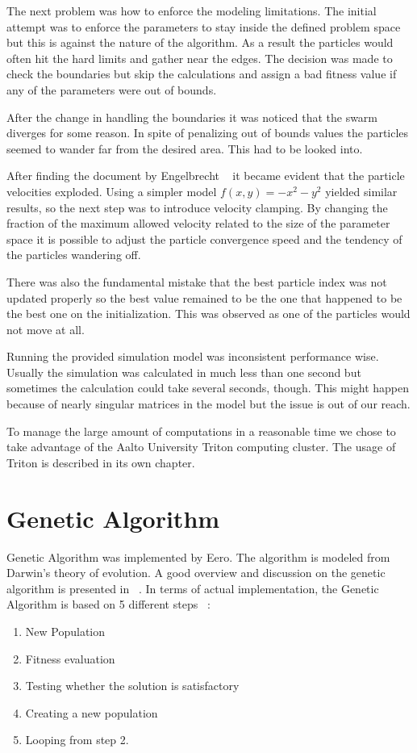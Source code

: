 \documentclass[twoside]{article}
\begin{document}
\begin{multicols}{2}
The next problem was how to enforce the modeling limitations. The initial attempt was to enforce the parameters to stay inside the defined problem space but this is against the nature of the algorithm. As a result the particles would often hit the hard limits and gather near the edges. The decision was made to check the boundaries but skip the calculations and assign a bad fitness value if any of the parameters were out of bounds.

After the change in handling the boundaries it was noticed that the swarm diverges for some reason. In spite of penalizing out of bounds values the particles seemed to wander far from the desired area. This had to be looked into.

After finding the document by Engelbrecht ~\cite{pitfalls} it became evident that the particle velocities exploded. Using a simpler model $f(x,y)=-x^2-y^2$ yielded similar results, so the next step was to introduce velocity clamping. By changing the fraction of the maximum allowed velocity related to the size of the parameter space it is possible to adjust the particle convergence speed and the tendency of the particles wandering off.

There was also the fundamental mistake that the best particle index was not updated properly so the best value remained to be the one that happened to be the best one on the initialization. This was observed as one of the particles would not move at all.

Running the provided simulation model was inconsistent performance wise. Usually the simulation was calculated in much less than one second but sometimes the calculation could take several seconds, though. This might happen because of nearly singular matrices in the model but the issue is out of our reach.

To manage the large amount of computations in a reasonable time we chose to take advantage of the Aalto University Triton computing cluster. The usage of Triton is described in its own chapter.


\section{Genetic Algorithm}

Genetic Algorithm was implemented by Eero. The algorithm is modeled from Darwin’s theory of evolution. A good overview and discussion on the genetic algorithm is presented in ~\cite{mitchell}. In terms of actual implementation, the Genetic Algorithm is based on 5 different steps ~\cite{obitko}:
\begin{enumerate} \itemsep1pt \parskip0pt 
\item New Population
\item Fitness evaluation
\item Testing whether the solution is satisfactory
\item Creating a new population
\item Looping from step 2.
\end{enumerate}


\end{multicols}
\end{document}

